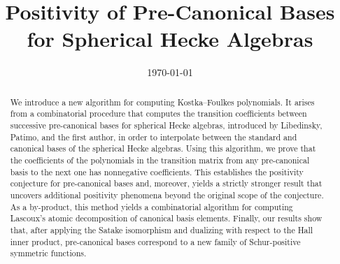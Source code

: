 \documentclass[11pt, a4paper,reqno]{amsart}
\title{Positivity of Pre-Canonical Bases for Spherical Hecke Algebras}
\author{#1}
\date{\today }
\numberwithin{equation}{section}
\numberwithin{theorem}{section}
\begin{document}
\maketitle




\begin{abstract}
We introduce a new algorithm for computing Kostka–Foulkes polynomials.
It arises from a combinatorial procedure that computes the transition coefficients between successive pre-canonical bases for spherical Hecke algebras, introduced by Libedinsky, Patimo, and the first author, in order to interpolate between the standard and canonical bases of the spherical Hecke algebras.
Using this algorithm, we prove that the coefficients of the polynomials in the transition matrix from any pre-canonical basis to the next one has nonnegative coefficients. This establishes the positivity conjecture for pre-canonical bases and, moreover, yields a strictly stronger result that uncovers additional positivity phenomena beyond the original scope of the conjecture.
As a by-product, this method yields a combinatorial algorithm for computing Lascoux’s atomic decomposition of canonical basis elements.
Finally, our results show that, after applying the Satake isomorphism and dualizing with respect to the Hall inner product, pre-canonical bases correspond to a new family of Schur-positive symmetric functions.
\end{abstract}



















%


 
 
\end{document}
